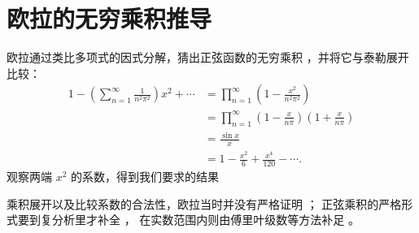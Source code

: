 \section{欧拉的无穷乘积推导}

欧拉通过类比多项式的因式分解，猜出正弦函数的无穷乘积 \cite{euler}，并将它与泰勒展开比较：
\begin{equation}
\begin{aligned}
1-\left(\sum_{n=1}^{\infty}\frac{1}{n^2\pi^2}\right)x^2+\cdots
&=\prod_{n=1}^{\infty}\left(1-\frac{x^2}{n^2\pi^2}\right)\\
&=\prod_{n=1}^{\infty}\left(1-\frac{x}{n\pi}\right)\left(1+\frac{x}{n\pi}\right)\\
&=\frac{\sin x}{x}\\
&=1-\frac{x^2}{6}+\frac{x^4}{120}-\cdots .
\end{aligned}
\label{eq:euler-product}
\end{equation}
观察两端 $x^2$ 的系数，得到我们要求的结果

乘积展开以及比较系数的合法性，欧拉当时并没有严格证明 \cite{euler}；
正弦乘积的严格形式要到复分析里才补全 \cite{ahlfors}，
在实数范围内则由傅里叶级数等方法补足 \cite{apostol}。
